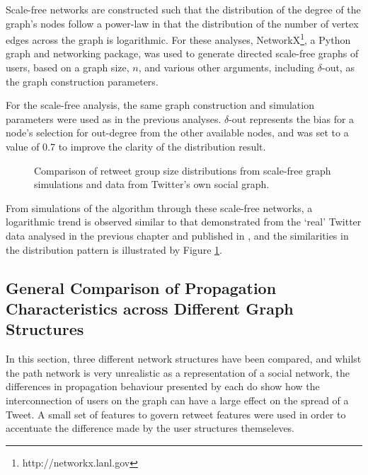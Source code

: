 Scale-free networks are constructed such that the distribution of the degree of the graph's nodes follow a power-law in that the distribution of the number of vertex edges across the graph is logarithmic. For these analyses, NetworkX\footnote{http://networkx.lanl.gov}, a Python graph and networking package, was used to generate directed scale-free graphs of users, based on a graph size, $n$, and various other arguments, including $\delta$-out, as the graph construction parameters. 

For the scale-free analysis, the same graph construction and simulation parameters were used as in the previous analyses. $\delta$-out represents the bias for a node's selection for out-degree from the other available nodes, and was set to a value of 0.7 to improve the clarity of the distribution result.

\begin{figure}[h]
\centering
{}
\caption{Comparison of retweet group size distributions from scale-free graph simulations and data from Twitter's own social graph.}
\label{fig:real-scalefree}
\end{figure}

From simulations of the algorithm through these scale-free networks, a logarithmic trend is observed similar to that demonstrated from the `real' Twitter data analysed in the previous chapter and published in \cite{webberley11}, and the similarities in the distribution pattern is illustrated by Figure \ref{fig:real-scalefree}.


\subsection{General Comparison of Propagation Characteristics across Different Graph Structures}
In this section, three different network structures have been compared, and whilst the path network is very unrealistic as a representation of a social network, the differences in propagation behaviour presented by each do show how the interconnection of users on the graph can have a large effect on the spread of a Tweet. A small set of features to govern retweet features were used in order to accentuate the difference made by the user structures themseleves.

